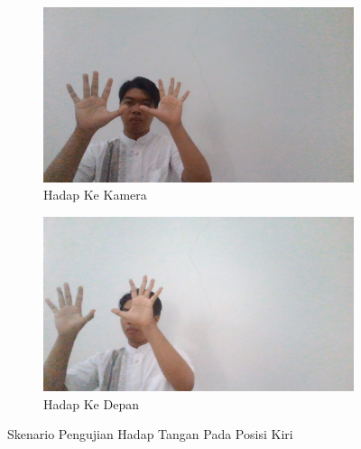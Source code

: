 \begin{enumerate}
  \begin{figure}[H]
    \centering
    \begin{subfigure}{0.7\textwidth}
      \centering
      \includegraphics[width=\linewidth]{../Gambar/KiriHadapKamera.jpg}
      \caption{Hadap Ke Kamera}
      \label{fig:kirihadapkamera}
    \end{subfigure}
    \begin{subfigure}{0.7\textwidth}
      \centering
      \includegraphics[width=\linewidth]{../Gambar/KiriHadapLurus.jpg}
      \caption{Hadap Ke Depan}
      \label{fig:kirihadaplurus}
    \end{subfigure}
    \centering
    \caption{Skenario Pengujian Hadap Tangan Pada Posisi Kiri}
    \label{fig:posisikiri}
  \end{figure}


\end{enumerate}
